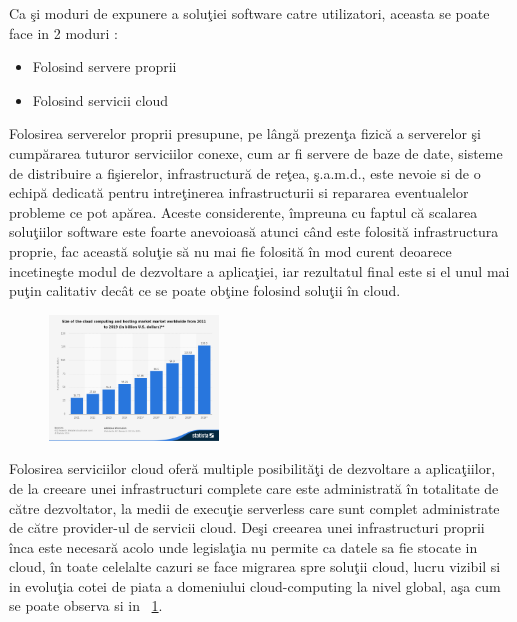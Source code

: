 \documentclass[a4paper,12pt]{report}
\begin{document}
Ca şi moduri de expunere a soluţiei software catre utilizatori, aceasta se poate face in 2 moduri :
\begin{itemize}
\item Folosind servere proprii
\item Folosind servicii cloud
\end{itemize}
\par
Folosirea serverelor proprii presupune, pe lângă prezenţa fizică a serverelor şi cumpărarea tuturor serviciilor conexe, cum ar fi servere de baze de date, sisteme de distribuire a fişierelor, infrastructură de reţea, ş.a.m.d., este nevoie si de o echipă dedicată pentru intreţinerea infrastructurii si repararea eventualelor probleme ce pot apărea. Aceste considerente, împreuna cu faptul că scalarea soluţiilor software este foarte anevoioasă atunci când este folosită infrastructura proprie, fac această soluţie să nu mai fie folosită în mod curent deoarece incetineşte modul de dezvoltare a aplicaţiei, iar rezultatul final este si el unul mai puţin calitativ decât ce se poate obţine folosind soluţii în cloud. 
\par
\begin{figure}
    \begin{center}
        \includegraphics[width=0.4\textwidth]{images/grafic_cloud_computing}
			\label{fig:cloud_computing_graph}
    \end{center}
\end{figure}
Folosirea serviciilor cloud oferă multiple posibilităţi de dezvoltare a aplicaţiilor, de la creeare unei infrastructuri complete care este administrată în totalitate de către dezvoltator, la medii de execuţie serverless care sunt complet administrate de către provider-ul de servicii cloud. 
Deşi creearea unei infrastructuri proprii înca este necesară acolo unde legislaţia nu permite ca datele sa fie stocate in cloud, în toate celelalte cazuri se face migrarea spre soluţii cloud, lucru vizibil si in evoluţia cotei de piata a domeniului cloud-computing la nivel global, aşa cum se poate observa si in ~\ref{fig:cloud_computing_graph}. 
\end{document}
